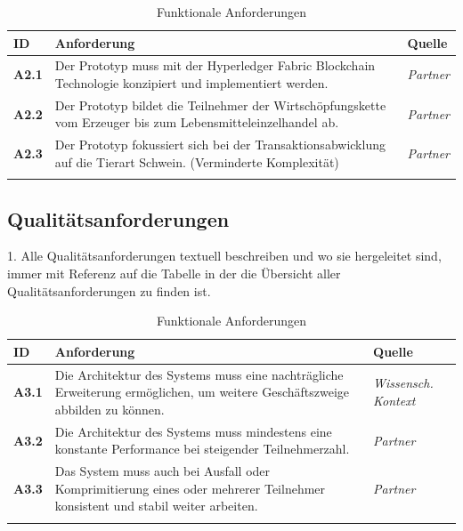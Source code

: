 \begin{table}[H]
    \begin{tabularx}{\textwidth}{@{}lXp{2cm}@{}}
        \toprule
        ID                & Anforderung & Quelle \\
        \midrule
        \textbf{A2.1}              & Der Prototyp muss mit der Hyperledger Fabric Blockchain Technologie konzipiert und implementiert werden.                     & \textit{Partner}                \\ \addlinespace
        \textbf{A2.2}              & Der Prototyp bildet die Teilnehmer der Wirtschöpfungskette vom Erzeuger bis zum Lebensmitteleinzelhandel ab.                     & \textit{Partner}                \\ \addlinespace
        \textbf{A2.3}              & Der Prototyp fokussiert sich bei der Transaktionsabwicklung auf die Tierart Schwein. (Verminderte Komplexität)                     & \textit{Partner}                \\ \addlinespace
        \bottomrule
    \end{tabularx}
    \caption{Funktionale Anforderungen}
    \label{tab:functional-requirements}
\end{table}

\subsection{Qualitätsanforderungen}
1. Alle Qualitätsanforderungen textuell beschreiben und wo sie hergeleitet sind, immer mit Referenz auf die Tabelle in der die Übersicht aller Qualitätsanforderungen zu finden ist.

\begin{table}[H]
    \begin{tabularx}{\textwidth}{@{}lXp{2cm}@{}}
        \toprule
        ID                & Anforderung & Quelle \\
        \midrule
        \textbf{A3.1}              & Die Architektur des Systems muss eine nachträgliche Erweiterung ermöglichen, um weitere Geschäftszweige abbilden zu können.                     & \textit{Wissensch. Kontext}                \\ \addlinespace
        \textbf{A3.2}              & Die Architektur des Systems muss mindestens eine konstante Performance bei steigender Teilnehmerzahl.                     & \textit{Partner}                \\ \addlinespace
        \textbf{A3.3}              & Das System muss auch bei Ausfall oder Komprimitierung eines oder mehrerer Teilnehmer konsistent und stabil weiter arbeiten.                    & \textit{Partner}                \\ \addlinespace
        \bottomrule
    \end{tabularx}
    \caption{Funktionale Anforderungen}
    \label{tab:functional-requirements}
\end{table}

